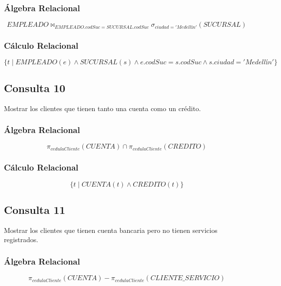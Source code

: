 \documentclass[stu,12pt,floatsintext]{apa7}
\begin{document}
\subsubsection{Álgebra Relacional}

\[
EMPLEADO
\bowtie_{EMPLEADO.codSuc=SUCURSAL.codSuc}
\sigma_{ciudad='Medellín'}(SUCURSAL)
\]

\subsubsection{Cálculo Relacional}

\[
\{t \mid
EMPLEADO(e)
\land
SUCURSAL(s)
\land
e.codSuc=s.codSuc
\land
s.ciudad='Medellín'
\}
\]




\subsection{Consulta 10}
Mostrar los clientes que tienen tanto una cuenta como un crédito.

\subsubsection{Álgebra Relacional}

\[
\pi_{cedulaCliente}(CUENTA)
\cap
\pi_{cedulaCliente}(CREDITO)
\]

\subsubsection{Cálculo Relacional}

\[
\{t \mid
CUENTA(t)
\land
CREDITO(t)
\}
\]


\subsection{Consulta 11}
Mostrar los clientes que tienen cuenta bancaria pero no tienen servicios registrados.

\subsubsection{Álgebra Relacional}

\[
\pi_{cedulaCliente}(CUENTA)
-
\pi_{cedulaCliente}(CLIENTE\_SERVICIO)
\]
\end{document}

